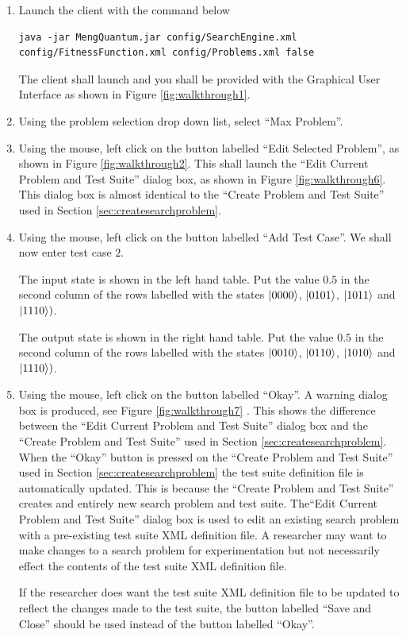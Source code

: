 \begin{enumerate}
 \item Launch the client with the command below
\begin{lstlisting}
java -jar MengQuantum.jar config/SearchEngine.xml config/FitnessFunction.xml config/Problems.xml false
\end{lstlisting}
The client shall launch and you shall be provided with the Graphical User Interface as shown in Figure \ref{fig:walkthrough1}.

\item Using the problem selection drop down list, select ``Max Problem''.

\item Using the mouse, left click on the button labelled ``Edit Selected Problem'', as shown in Figure \ref{fig:walkthrough2}.
This shall launch the ``Edit Current Problem and Test Suite'' dialog box, as shown in Figure \ref{fig:walkthrough6}.
This dialog box is almost identical to the ``Create Problem and Test Suite'' used in Section \ref{sec:createsearchproblem}.

\item Using the mouse, left click on the button labelled ``Add Test Case''.
We shall now enter test case $2$.

The input state is shown in the left hand table.
Put the value $0.5$ in the second column of the rows labelled with the states $\left\vert{0000}\right\rangle$, $\left\vert{0101}\right\rangle$, $\left\vert{1011}\right\rangle$ and $\left\vert{1110}\right\rangle)$.

The output state is shown in the right hand table.
Put the value $0.5$ in the second column of the rows labelled with the states $\left\vert{0010}\right\rangle$, $\left\vert{0110}\right\rangle$, $\left\vert{1010}\right\rangle$ and $\left\vert{1110}\right\rangle)$.

\item Using the mouse, left click on the button labelled ``Okay''.
A warning dialog box is produced, see Figure \ref{fig:walkthrough7} .
This shows the difference between the ``Edit Current Problem and Test Suite'' dialog box and the ``Create Problem and Test Suite'' used in Section \ref{sec:createsearchproblem}.
When the ``Okay'' button is pressed on the ``Create Problem and Test Suite'' used in Section \ref{sec:createsearchproblem} the test suite definition file is automatically updated.
This is because the ``Create Problem and Test Suite'' creates and entirely new search problem and test suite.
The``Edit Current Problem and Test Suite'' dialog box is used to edit an existing search problem with a pre-existing test suite XML definition file.
A researcher may want to make changes to a search problem for experimentation but not necessarily effect the contents of the test suite XML definition file.

If the researcher does want the test suite XML definition file to be updated to reflect the changes made to the test suite, the button labelled ``Save and Close'' should be used instead of the button labelled ``Okay''.

\end{enumerate}

